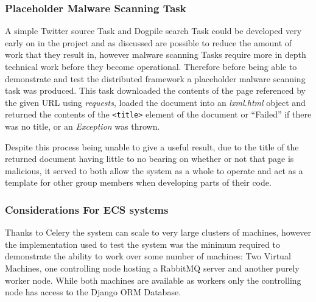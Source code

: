 \subsubsection{Placeholder Malware Scanning Task}
A simple Twitter source Task and Dogpile search Task could be developed very early on in the project and as discussed are possible to reduce the amount of work that they result in, however malware scanning Tasks require more in depth technical work before they become operational. Therefore 
before being able to demonstrate and test the distributed framework a placeholder malware scanning task was produced. This task downloaded the contents of the page referenced by the given URL using \emph{requests}, loaded the document into an \emph{lxml.html} object and returned the contents of the \verb`<title>` element of the document or ``Failed'' if there was no title, or an \emph{Exception} was thrown.

Despite this process being unable to give a useful result, due to the title of the returned document having little to no bearing on whether or not that page is malicious, it served to both allow the system as a whole to operate and act as a template for other group members when developing parts of their code.

\subsubsection{Considerations For ECS systems}
Thanks to Celery the system can scale to very large clusters of machines, however the implementation used to test the system was the minimum required to demonstrate the ability to work over some number of machines: Two Virtual Machines, one controlling node hosting a RabbitMQ server and another purely worker node. While both machines are available as workers only the controlling node has access to the Django ORM Database.